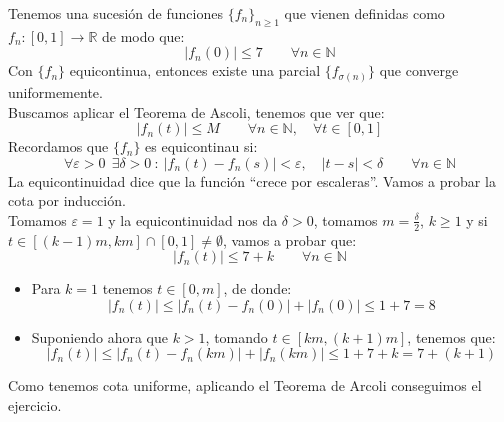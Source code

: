 \begin{ejercicio}
    Tenemos una sucesión de funciones $\{f_n\}_{n\geq 1}$ que vienen definidas como $f_n:[0,1]\to \mathbb{R}$ de modo que:
    \begin{equation*}
        |f_n(0)| \leq 7 \qquad \forall n\in \mathbb{N}
    \end{equation*}
    Con $\{f_n\}$ equicontinua, entonces existe una parcial $\{f_{\sigma(n)}\}$ que converge uniformemente.\\

    \noindent
    Buscamos aplicar el Teorema de Ascoli, tenemos que ver que:
    \begin{equation*}
        |f_n(t)| \leq M \qquad \forall n\in \mathbb{N}, \quad \forall t\in [0,1]
    \end{equation*}
    Recordamos que $\{f_n\}$ es equicontinau si:
    \begin{equation*}
        \forall \varepsilon>0~~\exists \delta>0~:~ |f_n(t) - f_n(s)| < \varepsilon, \quad |t-s| < \delta\qquad \forall n\in \mathbb{N}
    \end{equation*}
    La equicontinuidad dice que la función ``crece por escaleras''. Vamos a probar la cota por inducción.\\

    \noindent
    Tomamos $\varepsilon = 1$ y la equicontinuidad nos da $\delta>0$, tomamos $m = \frac{\delta}{2}$, $k\geq 1$ y si $t\in [(k-1)m, km]\cap [0,1]\neq \emptyset $, vamos a probar que:
    \begin{equation*}
        |f_n(t)| \leq 7 + k \qquad \forall n\in \mathbb{N}
    \end{equation*}
    \begin{itemize}
        \item Para $k = 1$ tenemos $t\in [0,m]$, de donde:
            \begin{equation*}
                |f_n(t)| \leq |f_n(t)-f_n(0)| + |f_n(0)| \leq 1 + 7 = 8
            \end{equation*}
        \item Suponiendo ahora que $k > 1$, tomando $t\in [km, (k+1)m]$, tenemos que:
            \begin{equation*}
                |f_n(t)| \leq |f_n(t) - f_n(km)| + |f_n(km)| \leq 1 + 7 + k = 7 + (k+1)
            \end{equation*}
    \end{itemize}
    Como tenemos cota uniforme, aplicando el Teorema de Arcoli conseguimos el ejercicio.
\end{ejercicio}

